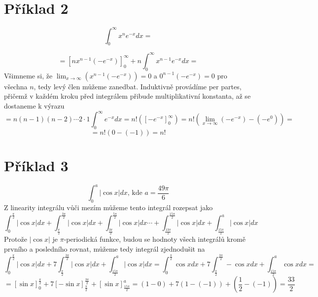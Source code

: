 \documentclass[11pt,a4paper]{article}
\begin{document}
\section*{Příklad 2}
$$
\int_0^\infty x^n e^{-x} dx =
$$
\begin{flushright}
[per partes: $u = x^n, v' = e^{-x}$]
\end{flushright}
$$
= \left[ nx^{n-1}(-e^{-x}) \right]_0^\infty + n\int_0^\infty x^{n-1}e^{-x} dx =
$$
Všimneme si, že $\lim_{x \to \infty} (x^{n-1}(-e^{-x})) = 0$ a $0^{n-1}(-e^{-x}) = 0$ pro všechna $n$, tedy levý člen můžeme zanedbat. Induktivně provádíme per partes, přičemž v každém kroku před integrálem přibude multiplikativní konstanta, až se dostaneme k výrazu
$$
= n(n-1)(n-2)\cdots2 \cdot 1 \int_0^\infty e^{-x} dx = n!\left( \left[ -e^{-x} \right]_0^\infty \right)=n!\left( \lim_{x \to \infty} (-e^{-x}) - (-e^0) \right)=
$$
$$
= n!( 0 - (-1)) = n!
$$

\section*{Příklad 3}
$$
\int_0^a \vert \cos x \vert dx \text{, kde } a = \frac{49\pi}{6}
$$
Z linearity integrálu vůči mezím můžeme tento integrál rozepsat jako
$$
\int_0^{\frac{\pi}{2}} \vert \cos x \vert dx +
\int_{\frac{\pi}{2}}^{\frac{3\pi}{2}} \vert \cos x \vert dx +
\int_{\frac{3\pi}{2}}^{\frac{5\pi}{2}} \vert \cos x \vert dx \cdots + 
\int_{\frac{13\pi}{2}}^{\frac{15\pi}{2}} \vert \cos x \vert dx + 
\int_{\frac{15\pi}{2}}^a \vert \cos x \vert dx
$$
Protože $\vert \cos x \vert$ je $\pi$-periodická funkce, budou se hodnoty všech integrálů kromě prvního a posledního rovnat, můžeme tedy integrál zjednodušit na
$$
\int_0^\frac{\pi}{2} \vert \cos x \vert dx + 
7\int_\frac{\pi}{2}^\frac{3\pi}{2} \vert \cos x \vert dx +
\int_{\frac{15\pi}{2}}^a \vert \cos x \vert dx 
=
\int_0^\frac{\pi}{2} \cos x dx + 
7\int_\frac{\pi}{2}^\frac{3\pi}{2} -\cos x dx +
\int_{\frac{15\pi}{2}}^a \cos x dx =
$$
$$
= 
\left[ \sin x \right]_0^{\frac{\pi}{2}} +
7\left[-\sin x\right]_\frac{\pi}{2}^\frac{3\pi}{2} +
\left[ \sin x \right]_\frac{15\pi}{2}^a 
=
(1-0)+7(1-(-1))+(\frac{1}{2}-(-1))
= \frac{33}{2}
$$
\end{document}

